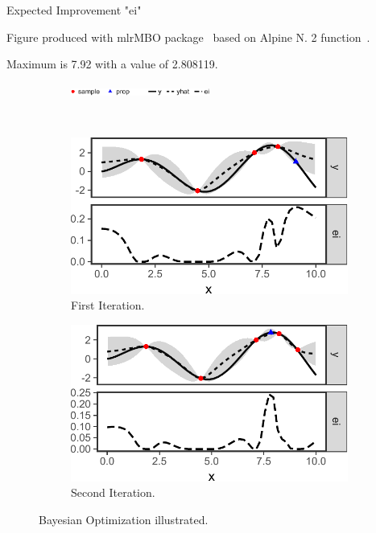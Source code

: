Expected Improvement "ei"

Figure produced with mlrMBO package~\cite{bischl2017mlrmbo} based on Alpine N. 2
function~\cite{clerc1999swarm}.

Maximum is 7.92 with a value of 2.808119.

\begin{figure}
  \begin{subfigure}{\textwidth}
    \centering
    \includegraphics[width=0.5\textwidth]{figures/bo-legend.pdf}
  \end{subfigure}
  \vspace{0.2em}
  \\
  \centering
  \begin{subfigure}{0.45\textwidth}
    \centering
    \includegraphics[width=\textwidth]{figures/bo1.pdf}
    \caption{First Iteration.}
  \end{subfigure}
  \hspace{1em}
  \begin{subfigure}{0.45\textwidth}
    \centering
    \includegraphics[width=\textwidth]{figures/bo2.pdf}
    \caption{Second Iteration.}
  \end{subfigure}
  \caption{Bayesian Optimization illustrated.}
  \label{fig:bo-1d}
\end{figure}

